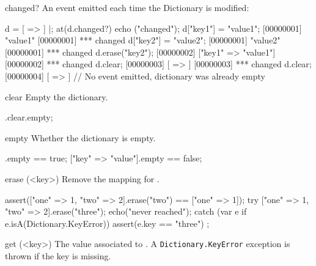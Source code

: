\begin{urbiscriptapi}
\item[changed?] An event emitted each time the Dictionary is modified:

\begin{urbiscript}
d = [ => ] |;
at(d.changed?) echo ("changed");
d["key1"] = "value1";
[00000001] "value1"
[00000001] *** changed
d["key2"] = "value2";
[00000001] "value2"
[00000001] *** changed
d.erase("key2");
[00000002] ["key1" => "value1"]
[00000002] *** changed
d.clear;
[00000003] [ => ]
[00000003] *** changed
d.clear;
[00000004] [ => ]
// No event emitted, dictionary was already empty
\end{urbiscript}

\item[clear]
  Empty the dictionary.

\begin{urbiassert}
["one" => 1].clear.empty;
\end{urbiassert}


\item[empty]
  Whether the dictionary is empty.

\begin{urbiassert}
[=>].empty == true;
["key" => "value"].empty == false;
\end{urbiassert}


\item[erase](<key>)
  Remove the mapping for .

\begin{urbiscript}
assert(["one" => 1, "two" => 2].erase("two") == ["one" => 1]);
try
{
  ["one" => 1, "two" => 2].erase("three");
  echo("never reached");
}
catch (var e if e.isA(Dictionary.KeyError))
{
  assert(e.key == "three")
};
\end{urbiscript}





\item[get](<key>)%
  The value associated to .  A \lstinline|Dictionary.KeyError|
  exception is thrown if the key is missing.


\end{urbiscriptapi}
